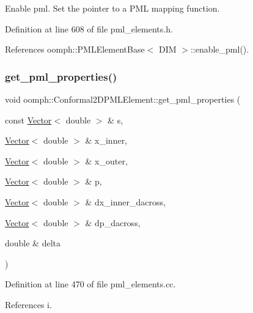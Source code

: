 Enable pml. Set the pointer to a P\+ML mapping function. 



Definition at line 608 of file pml\+\_\+elements.\+h.



References oomph\+::\+P\+M\+L\+Element\+Base$<$ D\+I\+M $>$\+::enable\+\_\+pml().

\mbox{\label{classoomph_1_1Conformal2DPMLElement_a42ec3c09776f3bd2cbb6b86dd1400cd0}} 
\subsubsection{\texorpdfstring{get\+\_\+pml\+\_\+properties()}{get\_pml\_properties()}}
{\footnotesize\ttfamily void oomph\+::\+Conformal2\+D\+P\+M\+L\+Element\+::get\+\_\+pml\+\_\+properties (\begin{DoxyParamCaption}\item[{const \hyperlink{classoomph_1_1Vector}{Vector}$<$ double $>$ \&}]{s,  }\item[{\hyperlink{classoomph_1_1Vector}{Vector}$<$ double $>$ \&}]{x\+\_\+inner,  }\item[{\hyperlink{classoomph_1_1Vector}{Vector}$<$ double $>$ \&}]{x\+\_\+outer,  }\item[{\hyperlink{classoomph_1_1Vector}{Vector}$<$ double $>$ \&}]{p,  }\item[{\hyperlink{classoomph_1_1Vector}{Vector}$<$ double $>$ \&}]{dx\+\_\+inner\+\_\+dacross,  }\item[{\hyperlink{classoomph_1_1Vector}{Vector}$<$ double $>$ \&}]{dp\+\_\+dacross,  }\item[{double \&}]{delta }\end{DoxyParamCaption})\hspace{0.3cm}{\ttfamily [protected]}}



Definition at line 470 of file pml\+\_\+elements.\+cc.



References i.

\mbox{\label{classoomph_1_1Conformal2DPMLElement_ab11344b74ec10ba88440e04ab95b7426}} 
